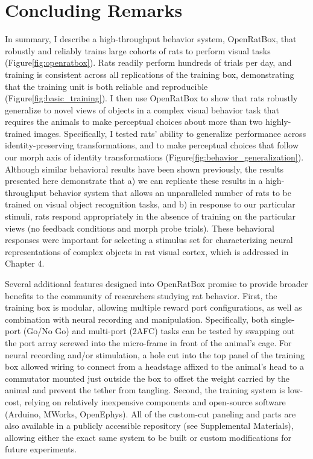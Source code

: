 \section{Concluding Remarks}
In summary, I describe a high-throughput behavior system, OpenRatBox, that robustly and reliably trains large cohorts of rats to perform visual tasks (Figure\ref{fig:openratbox}). Rats readily perform hundreds of trials per day, and training is consistent across all replications of the training box, demonstrating that the training unit is both reliable and reproducible (Figure\ref{fig:basic_training}). I then use OpenRatBox to show that rats robustly generalize to novel views of objects in a complex visual behavior task that requires the animals to make perceptual choices about more than two highly-trained images. Specifically, I tested rats' ability to generalize performance across identity-preserving transformations, and to make perceptual choices that follow our morph axis of identity transformations (Figure\ref{fig:behavior_generalization}). Although similar behavioral results have been shown previously\cite{Zoccolan2009, Tafazoli2012, Vermaercke2012}, the results presented here demonstrate that a) we can replicate these results in a high-throughput behavior system that allows an unparalleled number of rats to be trained on visual object recognition tasks, and b) in response to our particular stimuli, rats respond appropriately in the absence of training on the particular views (no feedback conditions and morph probe trials). These behavioral responses were important for selecting a stimulus set for characterizing neural representations of complex objects in rat visual cortex, which is addressed in Chapter 4. 

Several additional features designed into OpenRatBox promise to provide broader benefits to the community of researchers studying rat behavior. First, the training box is modular, allowing multiple reward port configurations, as well as combination with neural recording and manipulation. Specifically, both single-port (Go/No Go) and multi-port (2AFC) tasks can be tested by swapping out the port array screwed into the micro-frame in front of the animal's cage. For neural recording and/or stimulation, a hole cut into the top panel of the training box allowed wiring to connect from a headstage affixed to the animal's head to a commutator mounted just outside the box to offset the weight carried by the animal and prevent the tether from tangling. Second, the training system is low-cost, relying on relatively inexpensive components and open-source software (Arduino, MWorks, OpenEphys). All of the custom-cut paneling and parts are also available in a publicly accessible repository (see Supplemental Materials), allowing either the exact same system to be built or custom modifications for future experiments. 

